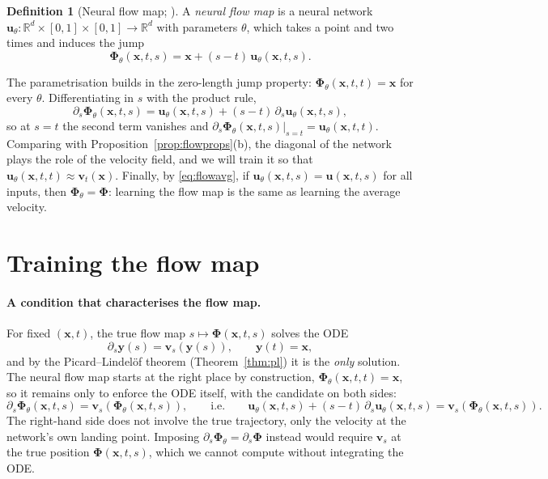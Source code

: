 \documentclass[11pt,a4paper]{article}
\numberwithin{equation}{section}     %
\theoremstyle{plain}        %
\theoremstyle{definition}   %
\newtheorem{definition}[theorem]{Definition}
\theoremstyle{remark}       %
\begin{document}
\begin{definition}[Neural flow map; \citealp{boffi2025build,ouyang2026}]\label{def:neuralflow}
A \emph{neural flow map} is a neural network $\mathbf{u}_\theta:\mathbb{R}^d\times[0,1]\times[0,1]\to\mathbb{R}^d$ with parameters $\theta$, which takes a point and two times and induces the jump
\[
\boldsymbol{\Phi}_\theta(\mathbf{x},t,s)=\mathbf{x}+(s-t)\,\mathbf{u}_\theta(\mathbf{x},t,s).
\]
\end{definition}

The parametrisation builds in the zero-length jump property: $\boldsymbol{\Phi}_\theta(\mathbf{x},t,t)=\mathbf{x}$ for every $\theta$. Differentiating in $s$ with the product rule,
\[
\partial_s\boldsymbol{\Phi}_\theta(\mathbf{x},t,s)=\mathbf{u}_\theta(\mathbf{x},t,s)+(s-t)\,\partial_s\mathbf{u}_\theta(\mathbf{x},t,s),
\]
so at $s=t$ the second term vanishes and $\partial_s\boldsymbol{\Phi}_\theta(\mathbf{x},t,s)\big|_{s=t}=\mathbf{u}_\theta(\mathbf{x},t,t)$. Comparing with Proposition~\ref{prop:flowprops}(b), the diagonal of the network plays the role of the velocity field, and we will train it so that $\mathbf{u}_\theta(\mathbf{x},t,t)\approx\mathbf{v}_t(\mathbf{x})$. Finally, by \eqref{eq:flowavg}, if $\mathbf{u}_\theta(\mathbf{x},t,s)=\mathbf{u}(\mathbf{x},t,s)$ for all inputs, then $\boldsymbol{\Phi}_\theta=\boldsymbol{\Phi}$: learning the flow map is the same as learning the average velocity.


\section{Training the flow map}\label{sec:trainflow}

\paragraph{A condition that characterises the flow map.} For fixed $(\mathbf{x},t)$, the true flow map $s\mapsto\boldsymbol{\Phi}(\mathbf{x},t,s)$ solves the ODE
\[
\partial_s\mathbf{y}(s)=\mathbf{v}_s\left(\mathbf{y}(s)\right),\qquad\mathbf{y}(t)=\mathbf{x},
\]
and by the Picard--Lindel\"of theorem (Theorem~\ref{thm:pl}) it is the \emph{only} solution. The neural flow map starts at the right place by construction, $\boldsymbol{\Phi}_\theta(\mathbf{x},t,t)=\mathbf{x}$, so it remains only to enforce the ODE itself, with the candidate on both sides:
\[
\partial_s\boldsymbol{\Phi}_\theta(\mathbf{x},t,s)=\mathbf{v}_s\left(\boldsymbol{\Phi}_\theta(\mathbf{x},t,s)\right),
\qquad\text{i.e.}\qquad
\mathbf{u}_\theta(\mathbf{x},t,s)+(s-t)\,\partial_s\mathbf{u}_\theta(\mathbf{x},t,s)=\mathbf{v}_s\left(\boldsymbol{\Phi}_\theta(\mathbf{x},t,s)\right).
\]
The right-hand side does not involve the true trajectory, only the velocity at the network's own landing point. Imposing $\partial_s\boldsymbol{\Phi}_\theta=\partial_s\boldsymbol{\Phi}$ instead would require $\mathbf{v}_s$ at the true position $\boldsymbol{\Phi}(\mathbf{x},t,s)$, which we cannot compute without integrating the ODE.
\end{document}
